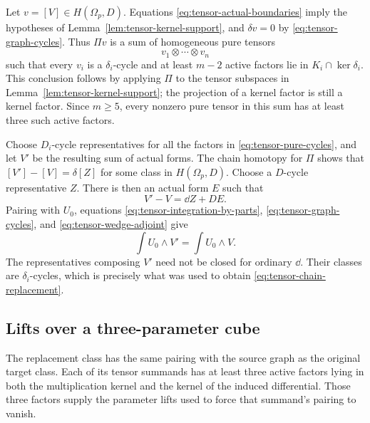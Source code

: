 Let \(v=[V]\in H(\Omega_p,D)\).  Equations
\eqref{eq:tensor-actual-boundaries} imply the hypotheses of
Lemma~\ref{lem:tensor-kernel-support}, and \(\delta v=0\) by
\eqref{eq:tensor-graph-cycles}.  Thus \(\Pi v\) is a sum of homogeneous
pure tensors
\begin{equation}\label{eq:tensor-pure-cycles}
                   v_1\otimes\cdots\otimes v_n
\end{equation}
such that every \(v_i\) is a \(\delta_i\)-cycle and at least \(m-2\)
active factors lie in \(K_i\cap\ker\delta_i\).
This conclusion follows by applying \(\Pi\) to the tensor subspaces in
Lemma~\ref{lem:tensor-kernel-support}; the projection of a kernel factor
is still a kernel factor.
Since \(m\geq5\), every nonzero pure tensor in this sum has at least three
such active factors.

Choose \(D_i\)-cycle representatives for all the factors in
\eqref{eq:tensor-pure-cycles}, and let \(V'\) be the resulting sum of
actual forms.  The chain homotopy for \(\Pi\) shows that
\([V']-[V]=\delta[Z]\) for some class in \(H(\Omega_p,D)\).
Choose a \(D\)-cycle representative \(Z\).
There is then an actual form \(E\) such that
\begin{equation}\label{eq:tensor-chain-replacement}
                         V'-V=\dd Z+D E .
\end{equation}
Pairing with \(U_0\), equations
\eqref{eq:tensor-integration-by-parts},
\eqref{eq:tensor-graph-cycles}, and
\eqref{eq:tensor-wedge-adjoint} give
\begin{equation}\label{eq:tensor-pairing-preserved}
                    \int U_0\wedge V'=\int U_0\wedge V .
\end{equation}
The representatives composing \(V'\) need not be closed for ordinary
\(\dd\).  Their classes are \(\delta_i\)-cycles, which is precisely what
was used to obtain \eqref{eq:tensor-chain-replacement}.

\subsection{Lifts over a three-parameter cube}

The replacement class has the same pairing with the source graph as
the original target class. Each of its tensor summands has at least
three active factors lying in both the multiplication kernel and the
kernel of the induced differential. Those three factors supply the
parameter lifts used to force that summand's pairing to vanish.

